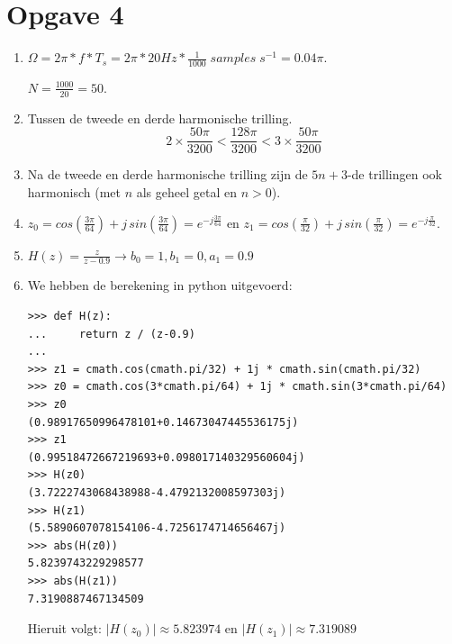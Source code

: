 \documentclass[10pt,a4paper]{article}
\begin{document}

\section*{Opgave 4} %
\label{sec:Opgave 4}

\begin{enumerate}
    \item $ \Omega = 2\pi * f * T_s = 2\pi * 20 Hz * \frac{1}{1000} \; samples
        \; s^{-1} = 0.04 \pi $.

    \noindent $ N = \frac{1000}{20} = 50 $.

    \item Tussen de tweede en derde harmonische trilling.
    \[ 2 \times \frac{50 \pi}{3200} < \frac{128 \pi}{3200} < 3 \times
    \frac{50 \pi}{3200} \]

    \item Na de tweede en derde harmonische trilling zijn de $5n+3$-de
    trillingen ook harmonisch (met $n$ als geheel getal en $n > 0$).

    \item $z_0 = cos(\frac{3\pi}{64}) + j \, sin(\frac{3\pi}{64}) =
    e^{-j\frac{3\pi}{64}}$ en $z_1 =
    cos(\frac{\pi}{32}) + j \, sin(\frac{\pi}{32}) = e^{-j\frac{\pi}{32}}$.

    \item $H(z) = \frac{z}{z-0.9} \rightarrow b_0 = 1, b_1 = 0, a_1 = 0.9$

    \item We hebben de berekening in python uitgevoerd:

    \begin{verbatim}
>>> def H(z):
...     return z / (z-0.9)
...
>>> z1 = cmath.cos(cmath.pi/32) + 1j * cmath.sin(cmath.pi/32)
>>> z0 = cmath.cos(3*cmath.pi/64) + 1j * cmath.sin(3*cmath.pi/64)
>>> z0
(0.98917650996478101+0.14673047445536175j)
>>> z1
(0.99518472667219693+0.098017140329560604j)
>>> H(z0)
(3.7222743068438988-4.4792132008597303j)
>>> H(z1)
(5.5890607078154106-4.7256174714656467j)
>>> abs(H(z0))
5.8239743229298577
>>> abs(H(z1))
7.3190887467134509
    \end{verbatim}

    Hieruit volgt: $|H(z_0)| \approx 5.823974$ en $|H(z_1)| \approx 7.319089$
\end{enumerate}
\end{document}
